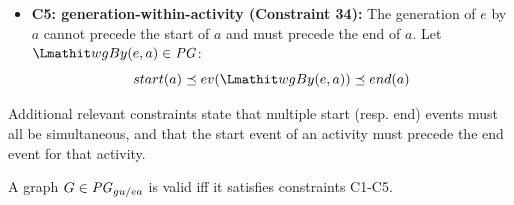 \begin{itemize}
	\item\textbf{C5: generation-within-activity (Constraint 34):} The generation of $e$ by $a$ cannot precede the start of $a$ and must precede the end of $a$.
	Let $\wgby(e,a) \in \pg$:
	\[ start(a) \preorder ev(\wgby(e,a))  \preorder end(a)\]
	

\end{itemize}

Additional relevant constraints state that multiple start (resp. end) events must all be simultaneous, and that the start event of an activity must precede the end event for that activity.
\\

\begin{definition}[Validity]
 A graph $G \in \mathit{PG}_{gu/ea}$ is valid iff it satisfies constraints C1-C5.
	\label{def:valid-guea}
\end{definition}

